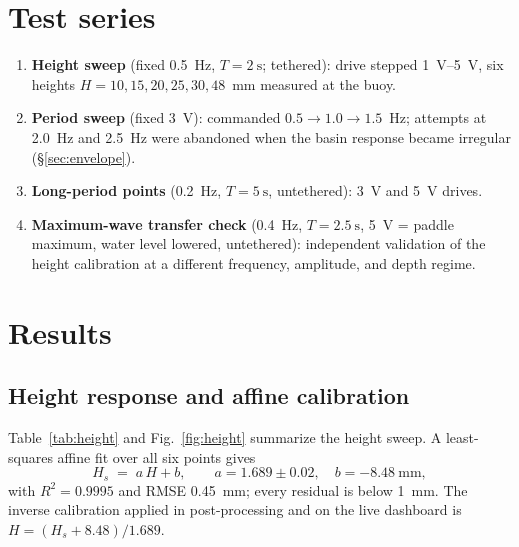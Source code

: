 \documentclass[11pt,a4paper]{article}
\begin{document}
\section{Test series}
\begin{enumerate}
  \item \textbf{Height sweep} (fixed \SI{0.5}{\hertz}, $T=\SI{2}{\second}$;
        tethered): drive stepped \SIrange{1}{5}{\volt}, six heights
        $H = 10, 15, 20, 25, 30, 48$~\si{\milli\meter} measured at the buoy.
  \item \textbf{Period sweep} (fixed \SI{3}{\volt}): commanded
        $0.5 \to 1.0 \to 1.5$~\si{\hertz}; attempts at \SI{2.0}{\hertz} and
        \SI{2.5}{\hertz} were abandoned when the basin response became
        irregular (\S\ref{sec:envelope}).
  \item \textbf{Long-period points} (\SI{0.2}{\hertz}, $T=\SI{5}{\second}$,
        untethered): \SI{3}{\volt} and \SI{5}{\volt} drives.
  \item \textbf{Maximum-wave transfer check} (\SI{0.4}{\hertz},
        $T=\SI{2.5}{\second}$, \SI{5}{\volt} = paddle maximum, water level
        lowered, untethered): independent validation of the height
        calibration at a different frequency, amplitude, and depth regime.
\end{enumerate}

\section{Results}

\subsection{Height response and affine calibration}
\label{sec:height}
Table~\ref{tab:height} and Fig.~\ref{fig:height} summarize the height sweep.
A least-squares affine fit over all six points gives
\begin{equation}
  H_s \;=\; a\,H + b, \qquad a = 1.689 \pm 0.02, \quad b = \SI{-8.48}{\milli\meter},
  \label{eq:affine}
\end{equation}
with $R^2 = 0.9995$ and RMSE \SI{0.45}{\milli\meter}; every residual is below
\SI{1}{\milli\meter}. The inverse calibration applied in post-processing and
on the live dashboard is $H = (H_s + 8.48)/1.689$.
\end{document}

